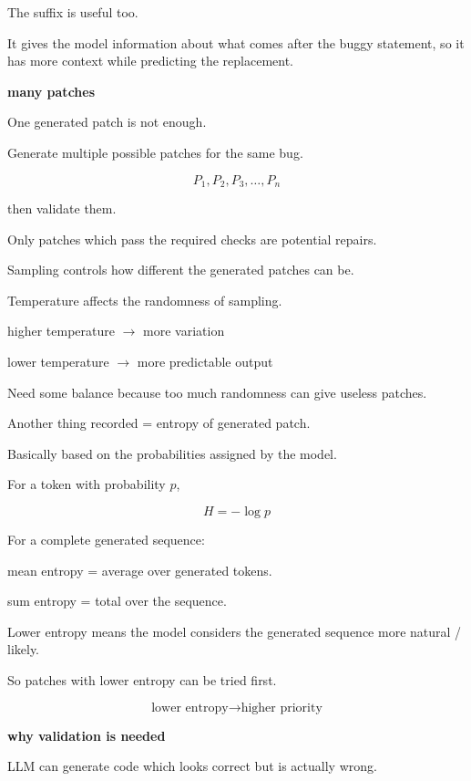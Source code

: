 \documentclass[11pt]{article}
\begin{document}
The suffix is useful too.

It gives the model information about what comes
after the buggy statement, so it has more context
while predicting the replacement.

\vspace{8pt}

\textbf{many patches}

One generated patch is not enough.

Generate multiple possible patches for the same bug.

\[
P_1,P_2,P_3,\ldots,P_n
\]

then validate them.

Only patches which pass the required checks are
potential repairs.

\vspace{7pt}

Sampling controls how different the generated patches
can be.

Temperature affects the randomness of sampling.

higher temperature $\rightarrow$ more variation

lower temperature $\rightarrow$ more predictable output

Need some balance because too much randomness can
give useless patches.

\vspace{7pt}

Another thing recorded = entropy of generated patch.

Basically based on the probabilities assigned by
the model.

For a token with probability $p$,

\[
H=-\log p
\]

For a complete generated sequence:

mean entropy = average over generated tokens.

sum entropy = total over the sequence.

Lower entropy means the model considers the generated
sequence more natural / likely.

So patches with lower entropy can be tried first.

\[
\text{lower entropy}
\rightarrow
\text{higher priority}
\]

\vspace{8pt}

\textbf{why validation is needed}

LLM can generate code which looks correct but is
actually wrong.
\end{document}
